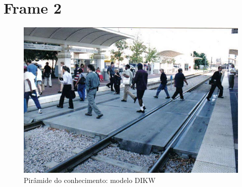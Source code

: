 \newpage
\section{Frame 2}

\begin{figure}[h]
	\centering
	\includegraphics[width=0.5\linewidth]{img/vision/frame2.jpg}
	\caption{Pirâmide do conhecimento: modelo DIKW}
	\label{db}
\end{figure}


